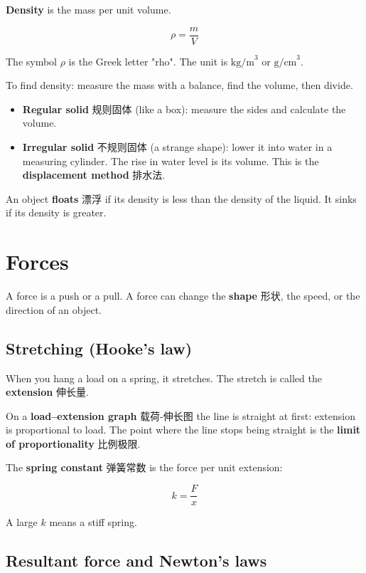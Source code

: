 \documentclass[11pt]{article}
\begin{document}
\textbf{Density} is the mass per unit volume.

\[
\rho = \frac{m}{V}
\]

The symbol $\rho$ is the Greek letter "rho". The unit is $\text{kg/m}^3$ or $\text{g/cm}^3$.

To find density: measure the mass with a balance, find the volume, then divide.

\begin{itemize}
\item \textbf{Regular solid} 规则固体 (like a box): measure the sides and calculate the volume.

\item \textbf{Irregular solid} 不规则固体 (a strange shape): lower it into water in a measuring cylinder. The rise in water level is its volume. This is the \textbf{displacement method} 排水法.

\end{itemize}

An object \textbf{floats} 漂浮 if its density is less than the density of the liquid. It sinks if its density is greater.

\section*{Forces}

A force is a push or a pull. A force can change the \textbf{shape} 形状, the speed, or the direction of an object.

\subsection*{Stretching (Hooke's law)}

When you hang a load on a spring, it stretches. The stretch is called the \textbf{extension} 伸长量.

On a \textbf{load–extension graph} 载荷-伸长图 the line is straight at first: extension is proportional to load. The point where the line stops being straight is the \textbf{limit of proportionality} 比例极限.

The \textbf{spring constant} 弹簧常数 is the force per unit extension:

\[
k = \frac{F}{x}
\]

A large $k$ means a stiff spring.

\subsection*{Resultant force and Newton's laws}
\end{document}
